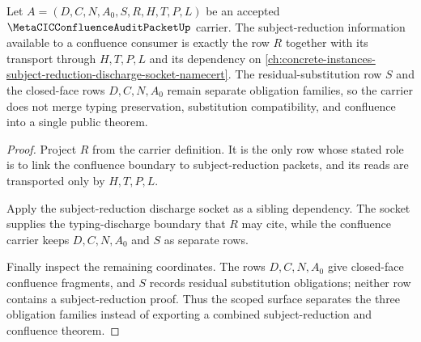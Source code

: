 \begin{theorem}
\label{thm:metacic-confluence-audit-subject-reduction-separation-scope}
Let $A=(D,C,N,A_0,S,R,H,T,P,L)$ be an accepted
$\MetaCICConfluenceAuditPacketUp$ carrier. The subject-reduction information
available to a confluence consumer is exactly the row $R$ together with its
transport through $H,T,P,L$ and its dependency on
\autoref{ch:concrete-instances-subject-reduction-discharge-socket-namecert}.
The residual-substitution row $S$ and the closed-face rows $D,C,N,A_0$ remain
separate obligation families, so the carrier does not merge typing
preservation, substitution compatibility, and confluence into a single public
theorem.
\end{theorem}
\begin{proof}
Project $R$ from the carrier definition. It is the only row whose stated role
is to link the confluence boundary to subject-reduction packets, and its reads
are transported only by $H,T,P,L$.

Apply the subject-reduction discharge socket as a sibling dependency. The
socket supplies the typing-discharge boundary that $R$ may cite, while the
confluence carrier keeps $D,C,N,A_0$ and $S$ as separate rows.

Finally inspect the remaining coordinates. The rows $D,C,N,A_0$ give
closed-face confluence fragments, and $S$ records residual substitution
obligations; neither row contains a subject-reduction proof. Thus the scoped
surface separates the three obligation families instead of exporting a combined
subject-reduction and confluence theorem.
\end{proof}


